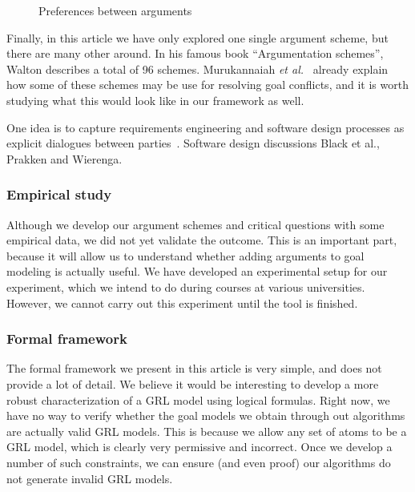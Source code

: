 \begin{figure}[ht]
\centering
{}
\caption{Preferences between arguments}
\label{fig:goalmodeling:futureargs}
\end{figure}  

Finally, in this article we have only explored one single argument scheme, but there are many other around. In his famous book ``Argumentation schemes'', Walton describes a total of 96 schemes. Murukannaiah \emph{et al.}~\cite{murukannaiah2015} already explain how some of these schemes may be use for resolving goal conflicts, and it is worth studying what this would look like in our framework as well.

One idea is to capture requirements engineering and software design processes as explicit dialogues between parties~\cite{finkelstein1989multiparty}. Software design discussions Black et al., Prakken and Wierenga.

\subsubsection*{Empirical study}

Although we develop our argument schemes and critical questions with some empirical data, we did not yet validate the outcome. This is an important part, because it will allow us to understand whether adding arguments to goal modeling is actually useful. We have developed an experimental setup for our experiment, which we intend to do during courses at various universities. However, we cannot carry out this experiment until the tool is finished.

\subsubsection*{Formal framework}

The formal framework we present in this article is very simple, and does not provide a lot of detail. We believe it would be interesting to develop a more robust characterization of a GRL model using logical formulas. Right now, we have no way to verify whether the goal models we obtain through out algorithms are actually valid GRL models. This is because we allow any set of atoms to be a GRL model, which is clearly very permissive and incorrect. Once we develop a number of such constraints, we can ensure (and even proof) our algorithms do not generate invalid GRL models. 

